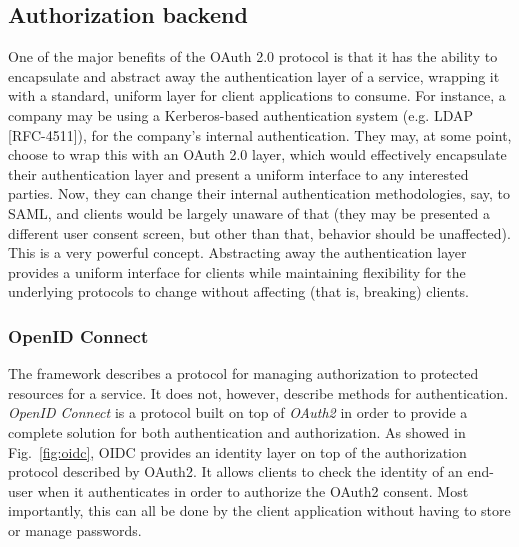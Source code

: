 \subsection{Authorization backend}
One of the major benefits of the OAuth 2.0 protocol is that it has the ability to encapsulate and abstract away the authentication layer of a service, wrapping it with a standard, uniform layer for client applications to consume. For instance, a company may be using a Kerberos-based authentication system (e.g. LDAP [RFC-4511]), for the company's internal authentication. They may, at some point, choose to wrap this with an OAuth 2.0 layer, which would effectively encapsulate their authentication layer and present a uniform interface to any interested parties. Now, they can change their internal authentication methodologies, say, to SAML, and clients would be largely unaware of that (they may be presented a different user consent screen, but other than that, behavior should be unaffected). This is a very powerful concept. Abstracting away the authentication layer provides a uniform interface for clients while maintaining flexibility for the underlying protocols to change without affecting (that is, breaking) clients.

\subsubsection{OpenID Connect}
The framework describes a protocol for managing authorization to protected resources for a service. It does not, however, describe methods for authentication. \textit{OpenID Connect} \cite{openid} is a protocol built on top of \textit{OAuth2} in order to provide a complete solution for both authentication and authorization. As showed in Fig.~\ref{fig:oidc}, OIDC provides an identity layer on top of the authorization protocol described by OAuth2. It allows clients to check the identity of an end-user when it authenticates in order to  authorize the OAuth2 consent. Most importantly, this can all be done by the client application without having to store or manage passwords.

